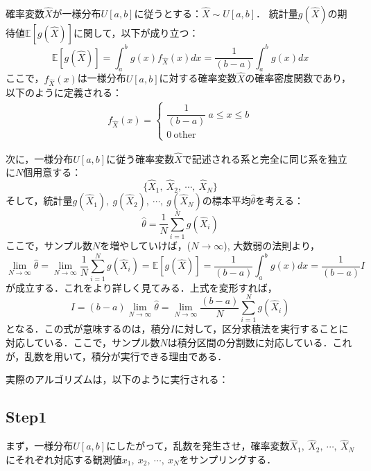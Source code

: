 確率変数$\hat{X}$が一様分布$U[a,b]$に従うとする：$\hat{X}\sim U[a,b]$．
統計量$g(\hat{X})$の期待値$\mathbb{E}[g(\hat{X})]$に関して，以下が成り立つ：
\begin{equation}
    \mathbb{E}[g(\hat{X})] = \int_{a}^b g(x) f_{\hat{X}}(x) dx =\frac{1}{(b-a)}\int_{a}^b g(x) dx
\end{equation}
ここで，$f_{\hat{X}}(x)$は一様分布$U[a,b]$に対する確率変数$\hat{X}$の確率密度関数であり，以下のように定義される：
\begin{align}
f_{\hat{X}}(x) = 
\left\{
    \begin{array}{l}
    \dfrac{1}{(b-a)}\ a\leq x \leq b \\[10pt]
    0\ \text{other}
    \end{array}
\right.
\end{align}

次に，一様分布$U[a,b]$に従う確率変数$\hat{X}$で記述される系と完全に同じ系を独立に$N$個用意する：
\begin{equation}
    \{\hat{X}_1,\ \hat{X}_2,\ \cdots,\ \hat{X}_N \}
\end{equation}
そして，統計量$g(\hat{X}_1),\ g(\hat{X}_2),\ \cdots,\ g(\hat{X}_N)$の標本平均$\hat{\theta}$を考える：
\begin{equation}
    \hat{\theta} = \frac{1}{N}\sum_{i=1}^{N} g(\hat{X}_i)
\end{equation}
ここで，サンプル数$N$を増やしていけば，($N\to\infty$), 大数弱の法則より，
\begin{equation}
    \lim_{N\to\infty}\hat{\theta} =  \lim_{N\to\infty}\frac{1}{N}\sum_{i=1}^{N} g(\hat{X}_i)
    =\mathbb{E}[g(\hat{X})]=\frac{1}{(b-a)}\int_{a}^b g(x) dx=\frac{1}{(b-a)}I
\end{equation}
が成立する．これをより詳しく見てみる．上式を変形すれば，
\begin{equation}
    I=(b-a)\lim_{N\to\infty}\hat{\theta}
    =\lim_{N\to\infty}\frac{(b-a)}{N}\sum_{i=1}^{N} g(\hat{X}_i)
\end{equation}
となる．この式が意味するのは，積分$I$に対して，区分求積法を実行することに対応している．ここで，サンプル数$N$は積分区間の分割数に対応している．これが，乱数を用いて，積分が実行できる理由である．

実際のアルゴリズムは，以下のように実行される：
\subsection*{Step1}
まず，一様分布$U[a,b]$にしたがって，乱数を発生させ，確率変数$\hat{X}_1,\ \hat{X}_2,\ \cdots,\ \hat{X}_N$にそれぞれ対応する観測値$x_1,\ x_2,\ \cdots,\ x_N$をサンプリングする．

